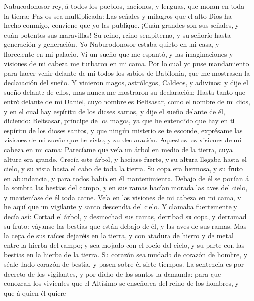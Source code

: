  Nabucodonosor rey, á todos los pueblos, naciones, y
lenguas, que moran en toda la tierra: Paz os sea multiplicada:
 Las señales y milagros que el alto Dios ha hecho conmigo,
conviene que yo las publique.  ¡Cuán grandes son sus
señales, y cuán potentes sus maravillas! Su reino, reino sempiterno, y
su señorío hasta generación y generación.  Yo Nabucodonosor
estaba quieto en mi casa, y floreciente en mi palacio.  Vi
un sueño que me espantó, y las imaginaciones y visiones de mi cabeza me
turbaron en mi cama.  Por lo cual yo puse mandamiento para
hacer venir delante de mí todos los sabios de Babilonia, que me
mostrasen la declaración del sueño.  Y vinieron magos,
astrólogos, Caldeos, y adivinos: y dije el sueño delante de ellos, mas
nunca me mostraron su declaración;  Hasta tanto que entró
delante de mí Daniel, cuyo nombre es Beltsasar, como el nombre de mi
dios, y en el cual hay espíritu de los dioses santos, y dije el sueño
delante de él, diciendo:  Beltsasar, príncipe de los magos,
ya que he entendido que hay en ti espíritu de los dioses santos, y que
ningún misterio se te esconde, exprésame las visiones de mi sueño que he
visto, y su declaración.  Aquestas las visiones de mi
cabeza en mi cama: Parecíame que veía un árbol en medio de la tierra,
cuya altura era grande.  Crecía este árbol, y hacíase
fuerte, y su altura llegaba hasta el cielo, y su vista hasta el cabo de
toda la tierra.  Su copa era hermosa, y su fruto en
abundancia, y para todos había en él mantenimiento. Debajo de él se
ponían á la sombra las bestias del campo, y en sus ramas hacían morada
las aves del cielo, y manteníase de él toda carne.  Veía en
las visiones de mi cabeza en mi cama, y he aquí que un vigilante y santo
descendía del cielo.  Y clamaba fuertemente y decía así:
Cortad el árbol, y desmochad sus ramas, derribad su copa, y derramad su
fruto: váyanse las bestias que están debajo de él, y las aves de sus
ramas.  Mas la cepa de sus raíces dejaréis en la tierra, y
con atadura de hierro y de metal entre la hierba del campo; y sea mojado
con el rocío del cielo, y su parte con las bestias en la hierba de la
tierra.  Su corazón sea mudado de corazón de hombre, y
séale dado corazón de bestia, y pasen sobre él siete tiempos.
 La sentencia es por decreto de los vigilantes, y por dicho
de los santos la demanda: para que conozcan los vivientes que el
Altísimo se enseñorea del reino de los hombres, y que á quien él quiere
